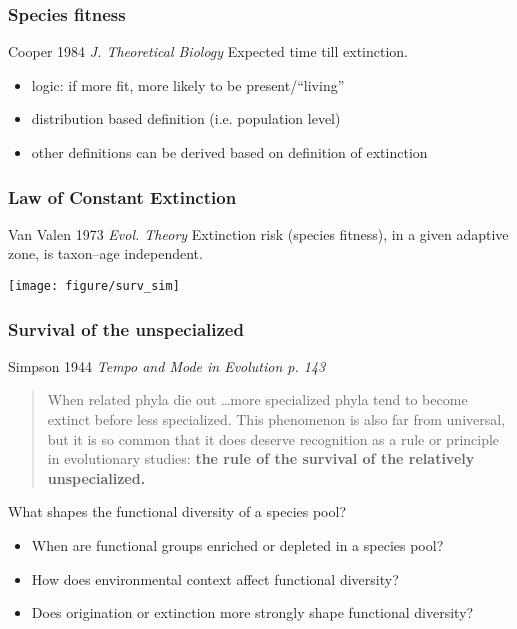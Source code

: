 \documentclass{beamer}
\begin{document}
\begin{frame}
  \frametitle{Species fitness}

  \begin{block}{Cooper 1984 \em{J. Theoretical Biology}}
    Expected time till extinction.
  \end{block}


  \begin{itemize}
    \item \alert{logic:} if more fit, more likely to be present/``living''
    \item distribution based definition (i.e. population level)
    \item other definitions can be derived based on definition of extinction
  \end{itemize}

\end{frame}

\begin{frame}
  \frametitle{Law of Constant Extinction}

  \begin{block}{Van Valen 1973 \em{Evol. Theory}}
    Extinction risk (species fitness), in a given adaptive zone, is taxon--age independent.
  \end{block}

  \begin{center}
    \texttt{[image: figure/surv\_sim]}

  \end{center}

\end{frame}

\begin{frame}
  \frametitle{Survival of the unspecialized}
  \begin{block}{Simpson 1944 \em{Tempo and Mode in Evolution} p. 143}
    \begin{quote}
      When related phyla die out \dots more specialized phyla tend to become extinct before less specialized. This phenomenon is also far from universal, but it is so common that it does deserve recognition as a rule or principle in evolutionary studies: \textbf{the rule of the survival of the relatively unspecialized.}
    \end{quote}
  \end{block}
\end{frame}




\begin{frame}
  \begin{alertblock}{What shapes the functional diversity of a species pool?}
    \begin{itemize}
      \item When are functional groups enriched or depleted in a species pool? 
      \item How does environmental context affect functional diversity?
      \item Does origination or extinction more strongly shape functional diversity?
    \end{itemize}
  \end{alertblock}
\end{frame}
\end{document}
